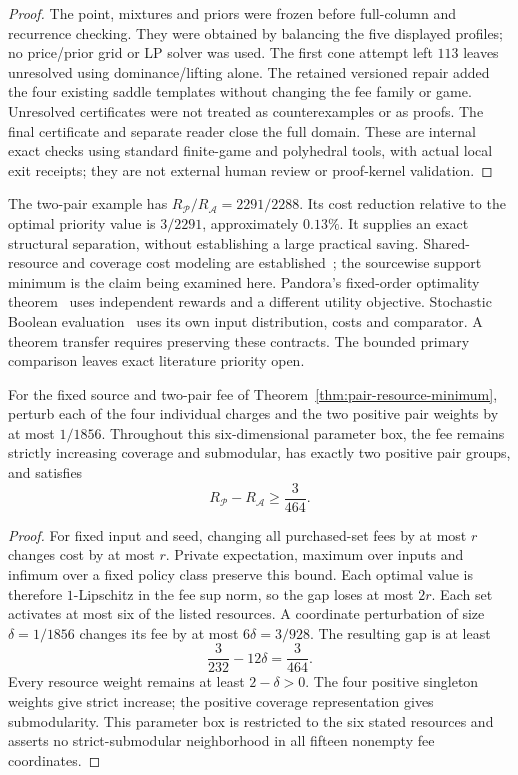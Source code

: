 \begin{proof}
The point, mixtures and priors were frozen before full-column and
recurrence checking. They were obtained by balancing the five displayed
profiles; no price/prior grid or LP solver was used. The first cone
attempt left $113$ leaves unresolved using dominance/lifting alone.
The retained versioned repair added the four existing saddle templates
without changing the fee family or game. Unresolved certificates were
not treated as counterexamples or as proofs. The final certificate and
separate reader close the full domain. These are internal exact checks
using standard finite-game and polyhedral tools, with actual local exit
receipts; they are not external human review or proof-kernel validation.
\end{proof}

The two-pair example has $R_{\mathcal P}/R_{\mathcal A}=2291/2288$.
Its cost reduction relative to the optimal priority value is $3/2291$,
approximately $0.13\%$. It supplies an exact structural separation,
without establishing a large practical saving. Shared-resource and
coverage cost modeling are established~\cite{harris2025}; the sourcewise
support minimum is the claim being examined here. Pandora's fixed-order
optimality theorem~\cite[Theorem~4.1 of the inspected version]{pandora}
uses independent rewards and a different utility objective. Stochastic
Boolean evaluation~\cite{hellerstein2022adaptivity} uses its own input
distribution, costs and comparator. A theorem transfer requires preserving
these contracts. The bounded primary comparison leaves exact literature
priority open.

\begin{corollary}
\label{cor:sparse-pair-resource-robust}
For the fixed source and two-pair fee of
Theorem~\ref{thm:pair-resource-minimum}, perturb each of the four
individual charges and the two positive pair weights by at most
$1/1856$. Throughout this six-dimensional parameter box, the fee remains
strictly increasing coverage and submodular, has exactly two positive
pair groups, and satisfies
\[
 R_{\mathcal P}-R_{\mathcal A}\geq\frac{3}{464}.
\]
\end{corollary}
\begin{proof}
For fixed input and seed, changing all purchased-set fees by at most $r$
changes cost by at most $r$. Private expectation, maximum over inputs and
infimum over a fixed policy class preserve this bound. Each optimal value
is therefore $1$-Lipschitz in the fee sup norm, so the gap loses at most
$2r$. Each set activates at most six of the listed resources. A coordinate
perturbation of size $\delta=1/1856$ changes its fee by at most
$6\delta=3/928$. The resulting gap is at least
\[
 \frac{3}{232}-12\delta=\frac{3}{464}.
\]
Every resource weight remains at least $2-\delta>0$. The four positive
singleton weights give strict increase; the positive coverage
representation gives submodularity. This parameter box is restricted
to the six stated resources and asserts no strict-submodular neighborhood
in all fifteen nonempty fee coordinates.
\end{proof}
